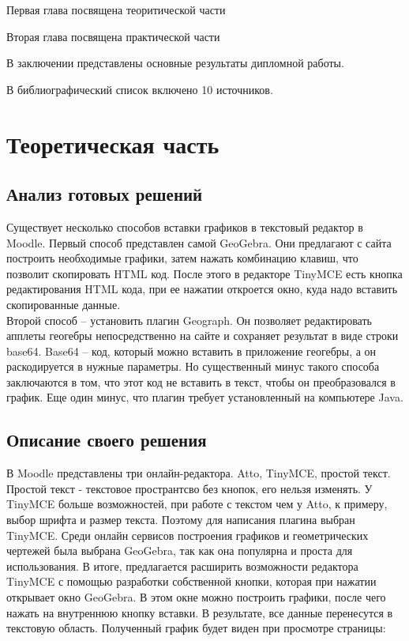 \documentclass[14pt,Diplom]{diplomwork}
\begin{document}
Первая глава посвящена теоритической части

Вторая глава посвящена практической части


В заключении представлены основные результаты дипломной работы.

В библиографический список включено 10 источников.



\chapter{Теоретическая часть}

\section{Анализ готовых решений}

Существует несколько способов вставки графиков в текстовый редактор в Moodle. Первый способ представлен самой GeoGebra. Они предлагают с сайта построить необходимые графики, затем нажать комбинацию клавиш, что позволит скопировать HTML код. После этого в редакторе TinyMCE есть кнопка редактирования HTML кода, при ее нажатии откроется окно, куда надо вставить скопированные данные.\\
Второй способ – установить плагин Geograph. Он позволяет редактировать апплеты геогебры непосредственно на сайте и сохраняет результат в виде строки base64. Base64 – код, который можно вставить в приложение геогебры, а он раскодируется в нужные параметры. Но существенный минус такого способа заключаются в том, что этот код не вставить в текст, чтобы он преобразовался в график. Еще один минус, что плагин требует установленный на компьютере Java.

\section{Описание своего решения}

В Moodle представлены три онлайн-редактора. Atto, TinyMCE, простой текст. Простой текст - текстовое пространтсво без кнопок, его нельзя изменять. У TinyMCE больше возможностей, при работе с текстом чем у Atto, к примеру, выбор шрифта и размер текста. Поэтому для написания плагина выбран TinyMCE. Среди онлайн сервисов построения графиков и геометрических чертежей была выбрана GeoGebra, так как она популярна и проста для использования. В итоге, предлагается расширить возможности редактора TinyMCE с помощью разработки собственной кнопки, которая при нажатии открывает окно GeoGebra. В этом окне можно построить графики, после чего нажать на внутреннюю кнопку вставки. В результате, все данные перенесутся в текстовую область. Полученный график будет виден при просмотре страницы:
\end{document}
